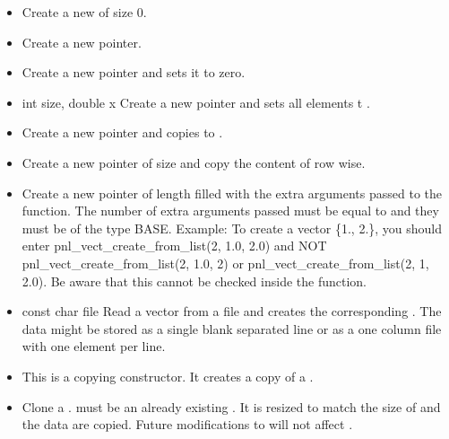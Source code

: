 \begin{itemize}
  \item {}
  \sshortdescribe Create a new \PnlVect of size 0.  
\item {}
  \sshortdescribe Create a new \PnlVect pointer.  
\item {}
  \sshortdescribe Create a new \PnlVect pointer and sets it to zero.  
\item {}
  {int size, double x}
  \sshortdescribe Create a new \PnlVect pointer and sets all
  elements t .  
\item {}
  \sshortdescribe Create a new \PnlVect pointer and copies 
  to .  
\item {}
  \sshortdescribe Create a new \PnlVect pointer of size 
  and copy the content of  row wise.
\item {}
  \sshortdescribe Create a new \PnlVect pointer of length
   filled with the extra arguments passed to the function. The
  number of extra arguments passed must be equal to  and they must be of the type BASE.
  Example: To create a vector \{1., 2.\}, you should enter pnl_vect_create_from_list(2, 1.0, 2.0) and NOT pnl_vect_create_from_list(2, 1.0, 2) or pnl_vect_create_from_list(2, 1, 2.0).
  Be aware that this cannot be checked inside the function.
\item {}
  {const char \ptr file}
  \sshortdescribe Read a vector from a file and creates the corresponding
  \PnlVect. The data might be stored as a single blank separated line
  or as a one column file with one element per line.

\item {}
  \sshortdescribe This is a copying constructor. It creates a copy of a \PnlVect.
\item {} 
  \sshortdescribe Clone a \PnlVect.  must be an
  already existing  \PnlVect. It is resized to match the size of
   and the data are copied. Future modifications to  will not
  affect .


\end{itemize}
